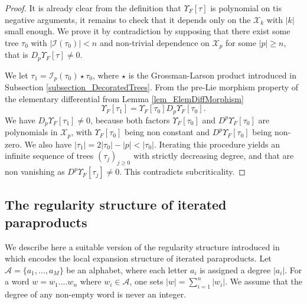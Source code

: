 \documentclass[11pt]{preprint}
\newcommand{\mcI}{\mathcal{I}}
\newcommand{\mcX}{\mathcal{X}}
\begin{document}
\begin{proof}
It is already clear from the definition that $\Upsilon_F[\tau]$ is polynomial on tis negative arguments, it remains to check that it depends only on the $\mcX_k$ with $|k|$ small enough. We prove it by contradiction by supposing that there exist some tree $\tau_0$ with $|\mcI(\tau_0)|<n$ and non-trivial dependence on $\mcX_p$ for some $|p|\geq n$, that is $D_p\Upsilon_F[\tau]\ne 0$.

We let $\tau_1 = \mcI_p(\tau_0) \star \tau_0$, where $\star$ is the Grossman-Larson product introduced in Subsection \ref{subsection_DecoratedTrees}. From the pre-Lie morphism property of the elementary differential from Lemma \ref{lem_ElemDiffMorphism}
$$
\Upsilon_F[\tau_1] =\Upsilon_F[\tau_0] D_p \Upsilon_F[\tau_0]. 
$$
We have $D_p\Upsilon_F[\tau_1]\ne 0$, because both factors $\Upsilon_F[\tau_0]$ and  $D^p\Upsilon_F[\tau_0]$ are polynomials in $\mcX_p$, with $\Upsilon_F[\tau_0]$ being non constant and $D^p\Upsilon_F[\tau_0]$ being non-zero. We also have $|\tau_1|= 2|\tau_0|-|p|<|\tau_0|$.
Iterating this procedure yields an infinite sequence of trees $(\tau_j)_{j\geq0}$ with strictly decreasing degree, and that are non vanishing as $D^p\Upsilon_F[\tau_j]\ne 0$. This contradicts subcriticality.
\end{proof}


	
	
	
	
	
	
	\subsection{The regularity structure of iterated paraproducts} \label{subsect_theRSIteratedParap}
	
	We describe here a suitable version of the regularity structure introduced in \cite{LocalExpansionsParacSystems} which encodes the local expansion structure of iterated paraproducts.
	Let $\mathcal{A}=\big\{a_1,\dots,a_M\big\}$ be an alphabet, where each letter $a_i$
	is assigned a degree $|a_i|$. For a word $ w = w_1....w_n $ where $w_i \in  \mathcal{A}$,  one sets
	$
		|w| = \sum_{i=1}^n |w_i|$.
	 We assume that the degree of any non-empty word is never an integer. 
	
\end{document}

